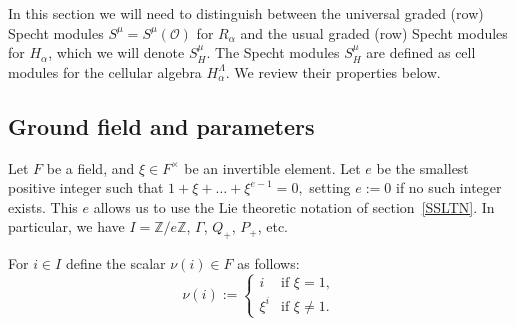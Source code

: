 \documentclass[twoside,11pt,reqno]{amsart}
\numberwithin{equation}{section}
\theoremstyle{definition}  %
\newcommand{\Z}{\mathbb{Z}}
\newcommand{\0}{{\bar 0}}
\newcommand{\1}{{\bar 1}}
\newcommand{\Ga}{\Gamma}
\newcommand{\La}{\Lambda}
\newcommand{\al}{\alpha}
\renewcommand\O{\mathcal O}
\begin{document}
In this section we will need to  distinguish between the universal graded (row) Specht modules $S^\mu=S^\mu(\O)$ for $R_\al$ and the usual graded (row) Specht modules for $H_\al$, which we will denote $S^\mu_H$. The Specht modules $S^\mu_H$ are defined as cell modules for the cellular algebra $H_\al^\La$. We review their properties below. %

\subsection{Ground field and parameters}
Let $F$ be a field, and $\xi \in F^\times$ be an invertible element. Let $e$ be the  smallest positive integer such that $1+\xi+\dots+\xi^{e-1} = 0,$ setting $e := 0$ if no such integer exists. This $e$ allows us to use the Lie theoretic notation of section~\ref{SSLTN}.  In particular, we have $I=\Z/e\Z$, $\Ga$, $Q_+$, $P_+$, etc. 

For $i\in I$ define the scalar $\nu(i)\in F$ as follows:
\begin{equation}\label{ENu}
  \nu(i):= \begin{cases}i &\text{if }\xi=1,\\\xi^i &\text{if }\xi\neq1.\end{cases}
\end{equation}
\end{document}
